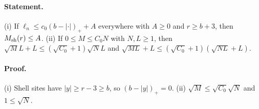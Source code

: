 \paragraph{Statement.} (i) If $\ell_n\leq c_0(b-|\cdot|)_++A$ everywhere with $A\geq0$ and $r\geq b+3$, then $M_{\rm sh}(r)\leq A$. (ii) If $0\leq M\leq C_0N$ with $N,L\geq1$, then
$\sqrt ML+L\leq(\sqrt{C_0}+1)\sqrt NL$ and $\sqrt{ML}+L\leq(\sqrt{C_0}+1)(\sqrt{NL}+L)$.
\paragraph{Proof.} (i) Shell sites have $|y|\geq r-3\geq b$, so $(b-|y|)_+=0$. (ii) $\sqrt M\leq\sqrt{C_0}\sqrt N$ and $1\leq\sqrt N$.
